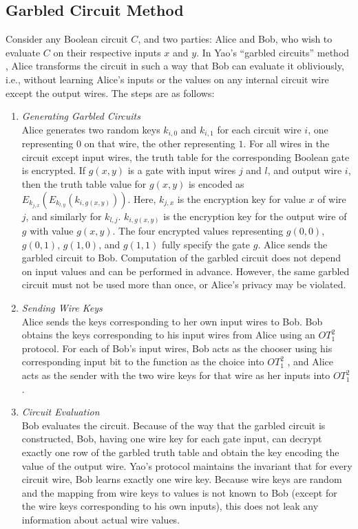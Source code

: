 \subsection{Garbled Circuit Method \label{sub:Garbled-Circuit-Method}}

Consider any Boolean circuit $C$, and two parties: Alice and Bob,
who wish to evaluate $C$ on their respective inputs $x$ and $y$.
In Yao's {}``garbled circuits'' method \cite{Yao86}, Alice transforms
the circuit in such a way that Bob can evaluate it obliviously, i.e.,
without learning Alice's inputs or the values on any internal circuit
wire except the output wires. The steps are as follows: 
\begin{enumerate}
\item \emph{Generating Garbled Circuits} \\
Alice generates two random keys $k_{i,0}$ and $k_{i,1}$ for each
circuit wire $i$, one representing $0$ on that wire, the other representing
$1$. For all wires in the circuit except input wires, the truth table
for the corresponding Boolean gate is encrypted. If $g(x,y)$ is a
gate with input wires $j$ and $l$, and output wire $i$, then the
truth table value for $g(x,y)$ is encoded as $E_{k_{j,x}}\left(E_{k_{l,y}}\left(k_{i,g(x,y)}\right)\right)$.
Here, $k_{j,x}$ is the encryption key for value $x$ of wire $j$,
and similarly for $k_{l,j}$. $k_{i,g(x,y)}$ is the encryption key
for the output wire of $g$ with value $g(x,y)$.  The four encrypted
values representing $g(0,0)$, $g(0,1)$, $g(1,0)$, and $g(1,1)$
fully specify the gate $g$. Alice sends the garbled circuit to Bob.
Computation of the garbled circuit does not depend on input values
and can be performed in advance. However, the same garbled circuit
must not be used more than once, or Alice's privacy may be violated. 
\item \emph{Sending Wire Keys} \\
Alice sends the keys corresponding to her own input wires to Bob.
Bob obtains the keys corresponding to his input wires from Alice using
an $OT_{1}^{2}$ protocol. For each of Bob's input wires, Bob acts
as the chooser using his corresponding input bit to the function as
the choice into $OT_{1}^{2}$ , and Alice acts as the sender with
the two wire keys for that wire as her inputs into $OT_{1}^{2}$ . 
\item \emph{Circuit Evaluation} \\
Bob evaluates the circuit. Because of the way that the garbled circuit
is constructed, Bob, having one wire key for each gate input, can
decrypt exactly one row of the garbled truth table and obtain the
key encoding the value of the output wire. Yao's protocol maintains
the invariant that for every circuit wire, Bob learns exactly one
wire key. Because wire keys are random and the mapping from wire keys
to values is not known to Bob (except for the wire keys corresponding
to his own inputs), this does not leak any information about actual
wire values. 
\end{enumerate}
